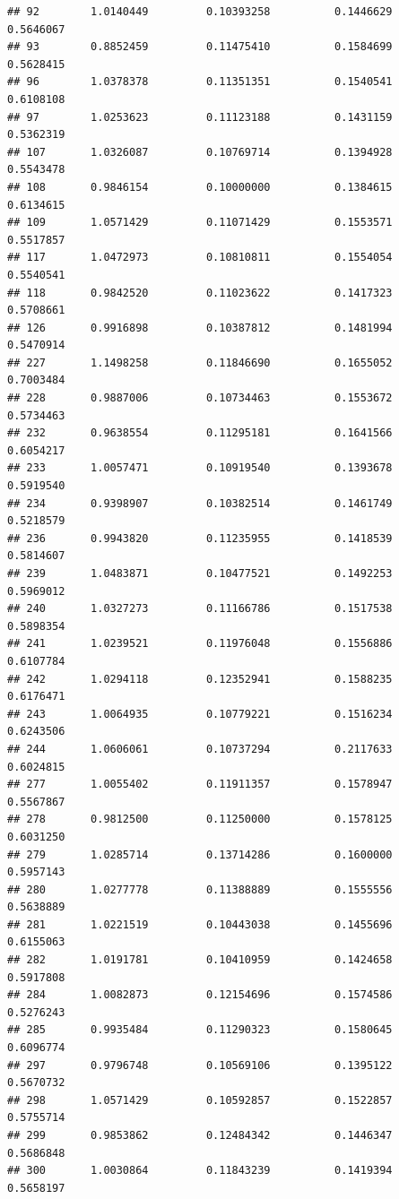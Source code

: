 \documentclass[]{article}
\begin{document}
\begin{verbatim}
## 92        1.0140449         0.10393258          0.1446629        0.5646067
## 93        0.8852459         0.11475410          0.1584699        0.5628415
## 96        1.0378378         0.11351351          0.1540541        0.6108108
## 97        1.0253623         0.11123188          0.1431159        0.5362319
## 107       1.0326087         0.10769714          0.1394928        0.5543478
## 108       0.9846154         0.10000000          0.1384615        0.6134615
## 109       1.0571429         0.11071429          0.1553571        0.5517857
## 117       1.0472973         0.10810811          0.1554054        0.5540541
## 118       0.9842520         0.11023622          0.1417323        0.5708661
## 126       0.9916898         0.10387812          0.1481994        0.5470914
## 227       1.1498258         0.11846690          0.1655052        0.7003484
## 228       0.9887006         0.10734463          0.1553672        0.5734463
## 232       0.9638554         0.11295181          0.1641566        0.6054217
## 233       1.0057471         0.10919540          0.1393678        0.5919540
## 234       0.9398907         0.10382514          0.1461749        0.5218579
## 236       0.9943820         0.11235955          0.1418539        0.5814607
## 239       1.0483871         0.10477521          0.1492253        0.5969012
## 240       1.0327273         0.11166786          0.1517538        0.5898354
## 241       1.0239521         0.11976048          0.1556886        0.6107784
## 242       1.0294118         0.12352941          0.1588235        0.6176471
## 243       1.0064935         0.10779221          0.1516234        0.6243506
## 244       1.0606061         0.10737294          0.2117633        0.6024815
## 277       1.0055402         0.11911357          0.1578947        0.5567867
## 278       0.9812500         0.11250000          0.1578125        0.6031250
## 279       1.0285714         0.13714286          0.1600000        0.5957143
## 280       1.0277778         0.11388889          0.1555556        0.5638889
## 281       1.0221519         0.10443038          0.1455696        0.6155063
## 282       1.0191781         0.10410959          0.1424658        0.5917808
## 284       1.0082873         0.12154696          0.1574586        0.5276243
## 285       0.9935484         0.11290323          0.1580645        0.6096774
## 297       0.9796748         0.10569106          0.1395122        0.5670732
## 298       1.0571429         0.10592857          0.1522857        0.5755714
## 299       0.9853862         0.12484342          0.1446347        0.5686848
## 300       1.0030864         0.11843239          0.1419394        0.5658197

\end{verbatim}
\end{document}
